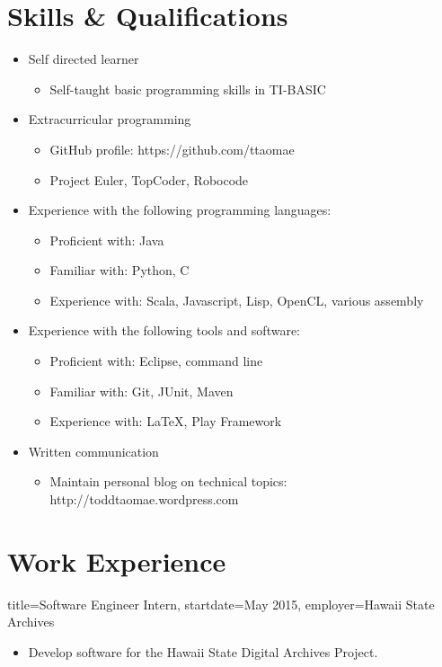 \documentclass{resume}
\begin{document}
\section*{Skills \& Qualifications}
\begin{itemize}
    \item{Self directed learner}
    \begin{itemize}
        \item{Self-taught basic programming skills in TI-BASIC}
    \end{itemize}

    \item{Extracurricular programming}
    \begin{itemize}
        \item{GitHub profile: https://github.com/ttaomae}
        \item{Project Euler, TopCoder, Robocode}
    \end{itemize}

    \item{Experience with the following programming languages:}
    \begin{itemize}
        \item{Proficient with: Java}
        \item{Familiar with: Python, C}
        \item{Experience with: Scala, Javascript, Lisp, OpenCL, various assembly}
    \end{itemize}

    \item{Experience with the following tools and software:}
    \begin{itemize}
        \item{Proficient with: Eclipse, command line}
        \item{Familiar with: Git, JUnit, Maven}
        \item{Experience with: \LaTeX, Play Framework}
    \end{itemize}

    \item{Written communication}
    \begin{itemize}
        \item{Maintain personal blog on technical topics: http://toddtaomae.wordpress.com}
    \end{itemize}
\end{itemize}


\section*{Work Experience}
\begin{job}{title=Software Engineer Intern,
            startdate=May 2015,
            employer=Hawaii State Archives}
    \begin{itemize}
        \item{Develop software for the Hawaii State Digital Archives Project.}
    \end{itemize}
\end{job}
\end{document}
